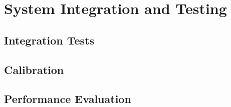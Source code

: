 \chapter{System Integration and Testing}

\setcounter{section}{0}
\setcounter{subsection}{0}

\section{Integration Tests}


\section{Calibration}


\section{Performance Evaluation}



